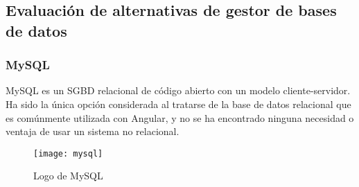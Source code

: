 \subsection{Evaluación de alternativas de gestor de bases de datos} 
\subsubsection{MySQL}
MySQL es un SGBD relacional de código abierto con un modelo cliente-servidor. Ha sido la única opción considerada al tratarse de la base de datos relacional que es comúnmente utilizada con Angular, y no se ha encontrado ninguna necesidad o ventaja de usar un sistema no relacional.
\begin{figure}[H]
	\centering
	\texttt{[image: mysql]}
	\caption{Logo de MySQL}
\end{figure}